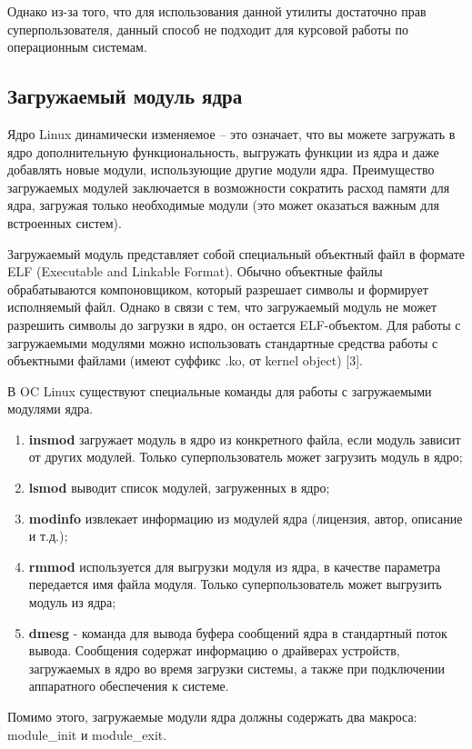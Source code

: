 Однако из-за того, что для использования данной утилиты достаточно прав суперпользователя, данный способ не подходит для курсовой работы по операционным системам.

\subsection*{Загружаемый модуль ядра}

Ядро Linux динамически изменяемое -- это означает, что вы можете загружать в ядро дополнительную функциональность, выгружать функции из ядра и даже добавлять новые модули, использующие другие модули ядра. Преимущество загружаемых модулей заключается в возможности сократить расход памяти для ядра, загружая только необходимые модули (это может оказаться важным для встроенных систем).

Загружаемый модуль представляет собой специальный объектный файл в формате ELF (Executable and Linkable Format). Обычно объектные файлы обрабатываются компоновщиком, который разрешает символы и формирует исполняемый файл. Однако в связи с тем, что загружаемый модуль не может разрешить символы до загрузки в ядро, он остается ELF-объектом. Для работы с загружаемыми модулями можно использовать стандартные средства работы с объектными файлами (имеют суффикс .ko, от kernel object) [3].


В OC Linux существуют специальные команды для работы с загружаемыми модулями ядра.
\begin{enumerate}
 \item \textbf{insmod} загружает модуль в ядро из конкретного файла, если модуль зависит от других модулей. Только суперпользователь может загрузить модуль в ядро;

\item \textbf{lsmod} выводит список модулей, загруженных в ядро;

\item \textbf{modinfo} извлекает информацию из модулей ядра (лицензия, автор, описание и т.д.);

\item \textbf{rmmod} используется для выгрузки модуля из ядра, в качестве параметра передается имя файла модуля. Только суперпользователь может выгрузить модуль из ядра;

\item \textbf{dmesg} - команда для вывода буфера сообщений ядра в стандартный поток вывода. Сообщения содержат информацию о драйверах устройств, загружаемых в ядро во время загрузки системы, а также при подключении аппаратного обеспечения к системе.
\end{enumerate}
Помимо этого, загружаемые модули ядра должны содержать два макроса:\\ module\_init и module\_exit.


